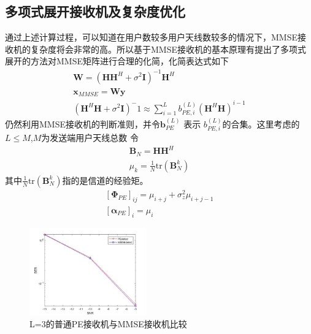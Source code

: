 \documentclass[bachelor,nocolorlinks, printoneside]{seuthesis} %
\begin{document}
\begin{Main}
\section{多项式展开接收机及复杂度优化}
通过上述计算过程，可以知道在用户数较多用户天线数较多的情况下，MMSE接收机的复杂度将会非常的高。所以基于MMSE接收机的基本原理有提出了多项式展开的方法对MMSE矩阵进行合理的化简，化简表达式如下
\begin{eqnarray}\label{key}
\mathbf{W} = (\mathbf{H}\mathbf{H}^H + \sigma^2 \mathbf{I})^{-1}\mathbf{H}^H  \nonumber \\
\mathbf{x}_{MMSE} = \mathbf{W} \mathbf{y}  \nonumber \\
(\mathbf{H}^H\mathbf{H}+\sigma^2\mathbf{I})^-1 \approx \sum_{i=1}^{L} b_{PE,i}^{(L)}(\mathbf{H}^H\mathbf{H})^{i-1}
\end{eqnarray}
仍然利用MMSE接收机的判断准则，并令$\mathbf{b}^{(L)}_{PE}$ 表示 $b_{PE,i}^{(L)}$的合集。这里考虑的$L \leq M$,$M$为发送端用户天线总数
令
\begin{eqnarray}\label{key}
\mathbf{B}_N = \mathbf{H}\mathbf{H}^H \nonumber \\
\mu_k = \frac{1}{N} \mathrm{tr}(\mathbf{B}_N^k) \nonumber
\end{eqnarray}
其中$\frac{1}{N} \mathrm{tr}(\mathbf{B}_N^k)$指的是信道的经验矩。
\begin{eqnarray}\label{key}
[\mathbf{\Phi}_{PE}]_{ij} = \mu_{i+j} + \sigma_{z}^2 \mu_{i+j-1} \nonumber \\
\left[\mathbf{\alpha}_{PE}\right]_i = \mu_i
\end{eqnarray}

\begin{figure}[htbp!]
	\centering \includegraphics[width=0.45\textwidth]{img/3_2.jpg} \caption{L=3的普通PE接收机与MMSE接收机比较}
\end{figure}


\end{Main}
\end{document}

